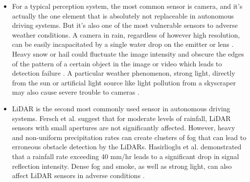 \documentclass[rnd]{mas_proposal}
\begin{document}
\begin{itemize}
      \item For a typical perception system, the most common sensor is camera, and it's actually the one element that is absolutely not replaceable in autonomous driving systems. But it's also one of the most vulnerable sensors to adverse weather conditions. A camera in rain, regardless of however high resolution, can be easily incapacitated by a single water drop on the emitter or lens \cite{mardirosian2021LiDAR}. Heavy snow or hail could fluctuate the image intensity and obscure the edges of the pattern of a certain object in the image or video which leads to detection failure \cite{zang2019impact}. A particular weather phenomenon, strong light, directly from the sun or artificial light source like light pollution from a skyscraper may also cause severe trouble to cameras \cite{acarballo2020libre}.

      \item LiDAR is the second most commonly used sensor in autonomous driving systems. Fersch et al. \cite{fersch2016influence} suggest that for moderate levels of rainfall, LiDAR sensors with small apertures are not significantly affected. However, heavy and non-uniform precipitation rates can create clusters of fog that can lead to erroneous obstacle detection by the LiDARs. Hasirlioglu et al. \cite{hasirlioglu2016modeling} demonstrated that a rainfall rate exceeding 40 mm/hr leads to a significant drop in signal reflection intensity. Dense fog and smoke, as well as strong light, can also affect LiDAR sensors in adverse conditions \cite{Zhang2021Dec} \cite{acarballo2020libre}.


\end{itemize}
\end{document}
